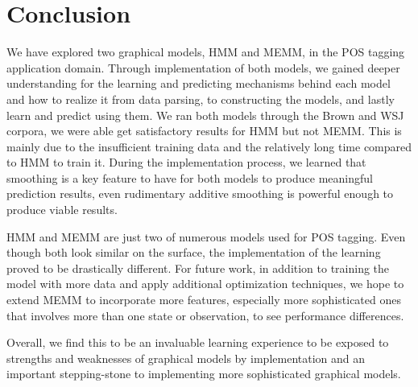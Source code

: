 \section{Conclusion}
We have explored two graphical models, HMM and MEMM, in the POS tagging application domain. Through implementation of both models, we gained deeper understanding for the learning and predicting mechanisms behind each model and how to realize it from data parsing, to constructing the models, and lastly learn and predict using them. We ran both models through the Brown and WSJ corpora, we were able get satisfactory results for HMM but not MEMM. This is mainly due to the insufficient training data and the relatively long time compared to HMM to train it. During the implementation process, we learned that smoothing is a key feature to have for both models to produce meaningful prediction results, even rudimentary additive smoothing is powerful enough to produce viable results.

HMM and MEMM are just two of numerous models used for POS tagging. Even though both look similar on the surface, the implementation of the learning proved to be drastically different. For future work, in addition to training the model with more data and apply additional optimization techniques, we hope to extend MEMM to incorporate more features, especially more sophisticated ones that involves more than one state or observation, to see performance differences.

Overall, we find this to be an invaluable learning experience to be exposed to strengths and weaknesses of graphical models by implementation and an important stepping-stone to implementing more sophisticated graphical models.
